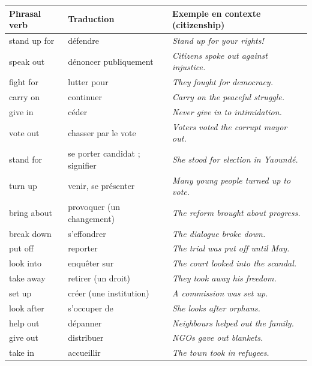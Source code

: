 \documentclass[11pt]{article}
\newcommand{\eng}[1]{\ifmmode\text{\textit{#1}}\else\begingroup\selectlanguage{english}\itshape #1\endgroup\fi}
\begin{document}
\begin{center}
\begin{tabularx}{\linewidth}{|l|l|X|}
\hline
\rowcolor{popblueL} \textbf{Phrasal verb} & \textbf{Traduction} & \textbf{Exemple en contexte (citizenship)} \\
\hline
stand up for & défendre & \eng{Stand up for your rights!} \\
\hline
speak out & dénoncer publiquement & \eng{Citizens spoke out against injustice.} \\
\hline
fight for & lutter pour & \eng{They fought for democracy.} \\
\hline
carry on & continuer & \eng{Carry on the peaceful struggle.} \\
\hline
give in & céder & \eng{Never give in to intimidation.} \\
\hline
vote out & chasser par le vote & \eng{Voters voted the corrupt mayor out.} \\
\hline
stand for & se porter candidat ; signifier & \eng{She stood for election in Yaoundé.} \\
\hline
turn up & venir, se présenter & \eng{Many young people turned up to vote.} \\
\hline
bring about & provoquer (un changement) & \eng{The reform brought about progress.} \\
\hline
break down & s'effondrer & \eng{The dialogue broke down.} \\
\hline
put off & reporter & \eng{The trial was put off until May.} \\
\hline
look into & enquêter sur & \eng{The court looked into the scandal.} \\
\hline
take away & retirer (un droit) & \eng{They took away his freedom.} \\
\hline
set up & créer (une institution) & \eng{A commission was set up.} \\
\hline
look after & s'occuper de & \eng{She looks after orphans.} \\
\hline
help out & dépanner & \eng{Neighbours helped out the family.} \\
\hline
give out & distribuer & \eng{NGOs gave out blankets.} \\
\hline
take in & accueillir & \eng{The town took in refugees.} \\
\hline
\end{tabularx}
\end{center}
\end{document}

